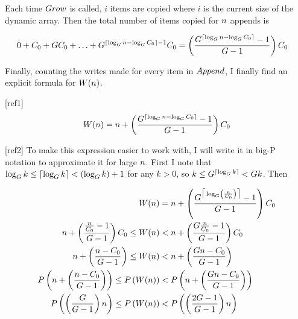 Each time $Grow$ is called, $i$ items are copied where $i$ is the current size of the dynamic array. Then the total number of items copied for $n$ appends is

\begin{align*}
0 + C_0 + GC_0 + \ldots + G^{\lceil \log_{G} n - \log_{G} C_0 \rceil - 1}C_0 &= \left( \frac{G^{\lceil \log_{G} n - \log_{G} C_0 \rceil} - 1}{G - 1} \right) C_0
\end{align*}

Finally, counting the writes made for every item in $Append$, I finally find an explicit formula for $W(n)$.

[ref1]
$$
W(n) = n + \left( \frac{G^{\lceil \log_{G} n - \log_{G} C_0 \rceil} - 1}{G - 1} \right) C_0
$$

[ref2]
To make this expression easier to work with, I will write it in big-P notation to approximate it for large $n$. First I note that $\log_{G} k \leq \lceil \log_{G} k \rceil < \left( \log_{G} k \right) + 1$ for any $k > 0$, so $k \leq G^{\lceil \log_{G} k \rceil} < G{k}$. Then

\begin{align*}
W(n) &= n + \left( \frac{G^{\big\lceil \log_{G} \left( \frac {n} {C_0} \right) \big\rceil} - 1}{G - 1} \right) C_0\\
n + \left( \frac{\frac{n}{C_0} - 1}{G - 1} \right) C_0 \leq W(n) &< n + \left( \frac{G\frac{n}{C_0} - 1}{G - 1} \right) C_0\\
n + \left( \frac{n - C_0}{G - 1} \right) \leq W(n) &< n + \left( \frac{Gn - C_0}{G - 1} \right)\\
P\left( n + \left( \frac{n - C_0}{G - 1} \right) \right) \leq P\left( W(n) \right) &< P\left( n + \left( \frac{Gn - C_0}{G - 1} \right) \right)\\
P\left( \left( \frac{G}{G - 1} \right) n \right) \leq P\left( W(n) \right) &< P\left( \left( \frac{2G - 1}{G - 1} \right) n \right)
\end{align*}

